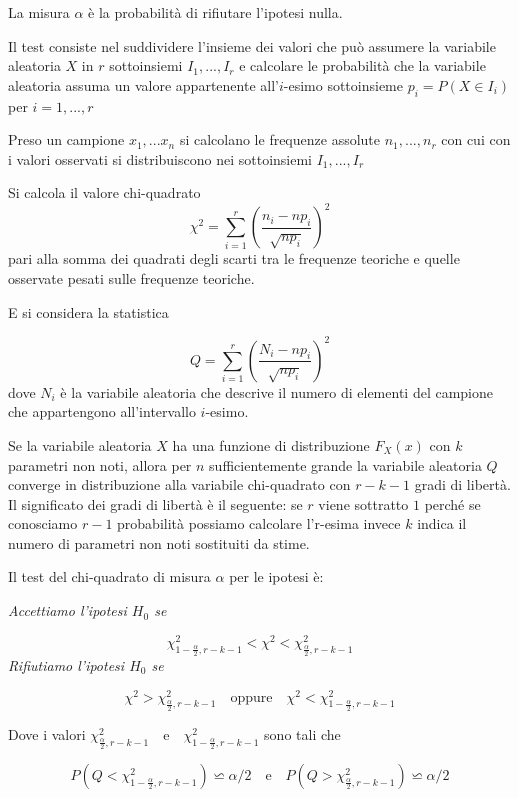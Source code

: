\documentclass[]{book}
\begin{document}
La misura \(\alpha\) è la probabilità di rifiutare l'ipotesi nulla.

Il test consiste nel suddividere l'insieme dei valori che può assumere
la variabile aleatoria \(X\) in \(r\) sottoinsiemi \(I_1,...,I_r\) e
calcolare le probabilità che la variabile aleatoria assuma un valore
appartenente all'\(i\)-esimo sottoinsieme \(p_i = P(X \in I_i)\) per
\(i=1,...,r\)

Preso un campione \(x_1,...x_n\) si calcolano le frequenze assolute
\(n_1,...,n_r\) con cui con i valori osservati si distribuiscono nei
sottoinsiemi \(I_1,...,I_r\)

Si calcola il valore chi-quadrato
\[\chi^2 = \sum_{i=1}^{r}\left(\frac{n_i - np_i}{\sqrt{np_i}}\right)^2\]
pari alla somma dei quadrati degli scarti tra le frequenze teoriche e
quelle osservate pesati sulle frequenze teoriche.

E si considera la statistica

\[Q = \sum_{i=1}^{r}\left(\frac{N_i - np_i}{\sqrt{np_i}}\right)^2\] dove
\(N_i\) è la variabile aleatoria che descrive il numero di elementi del
campione che appartengono all'intervallo \(i\)-esimo.

Se la variabile aleatoria \(X\) ha una funzione di distribuzione
\(F_X(x)\) con \(k\) parametri non noti, allora per \(n\)
sufficientemente grande la variabile aleatoria \(Q\) converge in
distribuzione alla variabile chi-quadrato con \(r-k-1\) gradi di
libertà.\\
Il significato dei gradi di libertà è il seguente: se \(r\) viene
sottratto \(1\) perché se conosciamo \(r-1\) probabilità possiamo
calcolare l'r-esima invece \(k\) indica il numero di parametri non noti
sostituiti da stime.

Il test del chi-quadrato di misura \(\alpha\) per le ipotesi è:

\emph{Accettiamo l'ipotesi \(H_0\) se}

\[\chi^2_{1-\frac{\alpha}{2},r-k-1} < \chi^2 < \chi^2_{\frac{\alpha}{2},r-k-1}\]
\emph{Rifiutiamo l'ipotesi \(H_0\) se}

\[\chi^2 > \chi^2_{\frac{\alpha}{2},r-k-1} \quad \text{oppure} \quad \chi^2 < \chi^2_{1-\frac{\alpha}{2},r-k-1}\]

Dove i valori
\(\chi^2_{\frac{\alpha}{2},r-k-1} \quad \text{e} \quad \chi^2_{1 - \frac{\alpha}{2},r-k-1}\)
sono tali che

\[P\left(Q < \chi^2_{1 -\frac{\alpha}{2},r-k-1} \right) \backsimeq \alpha / 2 \quad \text{e} \quad P\left(Q > \chi^2_{\frac{\alpha}{2},r-k-1} \right) \backsimeq  \alpha / 2\]
\end{document}
